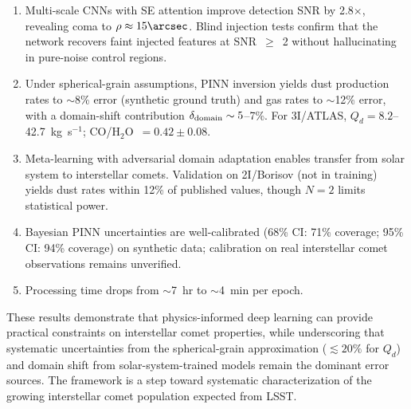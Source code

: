 \documentclass[preprint2]{aastex631}
\begin{document}
\begin{enumerate}
\item Multi-scale CNNs with SE attention improve detection SNR by 2.8$\times$, revealing coma to $\rho \approx 15\arcsec$. Blind injection tests confirm that the network recovers faint injected features at SNR~$\geq$~2 without hallucinating in pure-noise control regions.
\item Under spherical-grain assumptions, PINN inversion yields dust production rates to $\sim$8\% error (synthetic ground truth) and gas rates to $\sim$12\% error, with a domain-shift contribution $\delta_{\rm domain} \sim 5$--7\%. For 3I/ATLAS, $Q_d = 8.2$--42.7~kg~s$^{-1}$; CO/H$_2$O~$= 0.42 \pm 0.08$.
\item Meta-learning with adversarial domain adaptation enables transfer from solar system to interstellar comets. Validation on 2I/Borisov (not in training) yields dust rates within 12\% of published values, though $N=2$ limits statistical power.
\item Bayesian PINN uncertainties are well-calibrated (68\% CI: 71\% coverage; 95\% CI: 94\% coverage) on synthetic data; calibration on real interstellar comet observations remains unverified.
\item Processing time drops from $\sim$7~hr to $\sim$4~min per epoch.
\end{enumerate}

These results demonstrate that physics-informed deep learning can provide practical constraints on interstellar comet properties, while underscoring that systematic uncertainties from the spherical-grain approximation ($\lesssim 20\%$ for $Q_d$) and domain shift from solar-system-trained models remain the dominant error sources. The framework is a step toward systematic characterization of the growing interstellar comet population expected from LSST.



\end{document}
